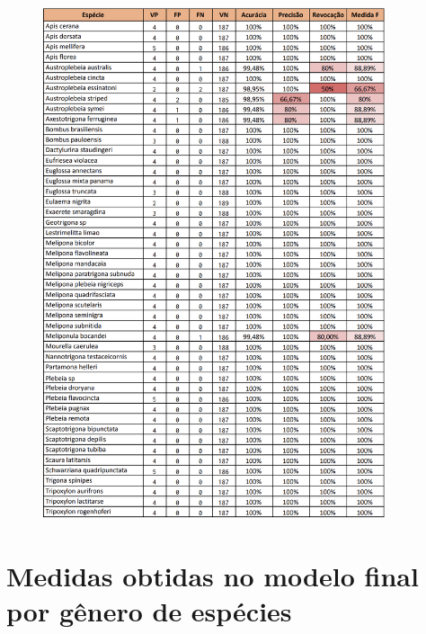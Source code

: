 \documentclass[
	12pt,				%
	oneside,			%
	a4paper,			%
	english,			%
	brazil				%
	]{abntex2ppgsi}
\begin{document}
\begin{apendicesenv}
\begin{figure}[ht]
    \centering
    \includegraphics[width=0.9\textwidth]{imagens/apendice/final_model_metrics_by_species.png}
\end{figure}

\chapter{Medidas obtidas no modelo final por gênero de espécies}


\end{apendicesenv}
\end{document}
